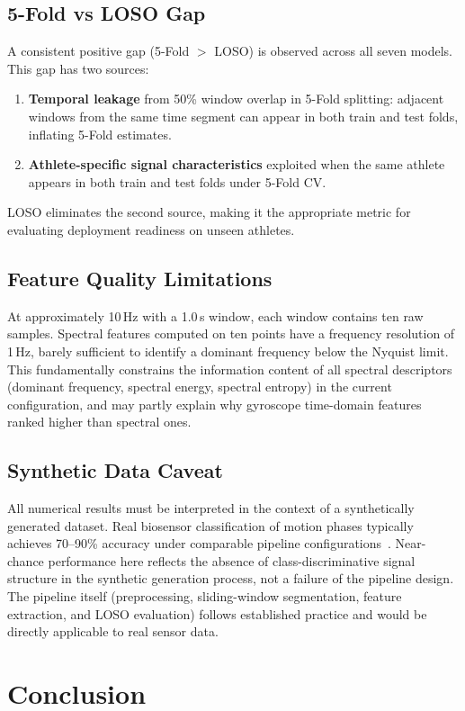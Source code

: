 \documentclass[12pt,a4paper]{cibb}
\begin{document}
\subsection{5-Fold vs LOSO Gap}
A consistent positive gap (5-Fold $>$ LOSO) is observed across all seven models. This gap has two sources:
\begin{enumerate}
    \item \textbf{Temporal leakage} from 50\% window overlap in 5-Fold splitting: adjacent windows from the same time segment can appear in both train and test folds, inflating 5-Fold estimates.
    \item \textbf{Athlete-specific signal characteristics} exploited when the same athlete appears in both train and test folds under 5-Fold CV.
\end{enumerate}
LOSO eliminates the second source, making it the appropriate metric for evaluating deployment readiness on unseen athletes.

\subsection{Feature Quality Limitations}
At approximately 10\,Hz with a 1.0\,s window, each window contains ten raw samples. Spectral features computed on ten points have a frequency resolution of 1\,Hz, barely sufficient to identify a dominant frequency below the Nyquist limit. This fundamentally constrains the information content of all spectral descriptors (dominant frequency, spectral energy, spectral entropy) in the current configuration, and may partly explain why gyroscope time-domain features ranked higher than spectral ones.

\subsection{Synthetic Data Caveat}
All numerical results must be interpreted in the context of a synthetically generated dataset. Real biosensor classification of motion phases typically achieves 70--90\% accuracy under comparable pipeline configurations~\cite{Vitali2020}. Near-chance performance here reflects the absence of class-discriminative signal structure in the synthetic generation process, not a failure of the pipeline design. The pipeline itself (preprocessing, sliding-window segmentation, feature extraction, and LOSO evaluation) follows established practice and would be directly applicable to real sensor data.

\section{Conclusion}
\label{sec:CONCLUSION}
\end{document}
